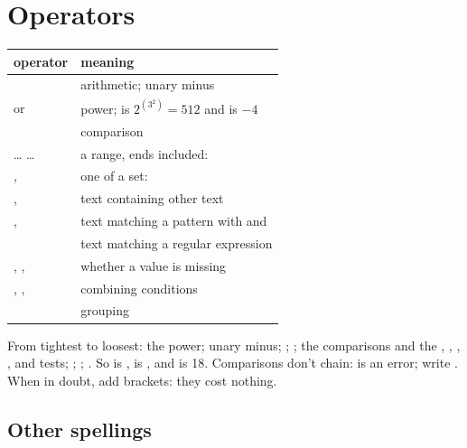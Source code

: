 \section{Operators}\label{sec:operators}

\begin{center}\small
\begin{tabularx}{\linewidth}{@{}lL@{}}
\toprule
\sffamily\bfseries operator & \sffamily\bfseries meaning \\
\midrule
\code{+ - * /} & arithmetic; unary minus \\
\code{\textasciicircum{}} or \code{**} & power;  is $2^{(3^2)} = 512$ and  is $-4$ \\
\code{= != < <= > >=} & comparison \\
 …  … & a range, ends included:  \\
,  & one of a set:  \\
,  & text containing other text \\
,  & text matching a pattern with \code{\%} and \code{\_} \\
 & text matching a regular expression \\
, ,  & whether a value is missing \\
, ,  & combining conditions \\
\code{( )} & grouping \\
\bottomrule
\end{tabularx}
\end{center}

From tightest to loosest: the power; unary minus; \code{* /}; \code{+ -}; the comparisons and the
, , , ,  and  tests; ;
; . So  is ,  is
, and  is 18. Comparisons don't chain:
 is an error; write . When in doubt, add brackets: they
cost nothing.

\subsection{Other spellings}

